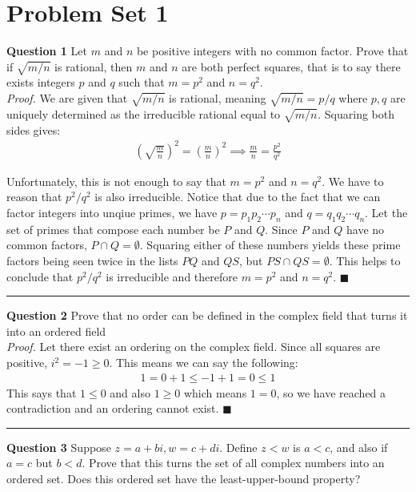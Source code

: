 \documentclass[14pt]{extarticle}
\begin{document}
\section*{Problem Set 1}

\textbf{Question 1} Let $m$ and $n$ be positive integers with no common factor. Prove that if $\sqrt{m/n}$ is rational, then $m$
and $n$ are both perfect squares, that is to say there exists integers $p$ and $q$ such that $m = p^2$ and $n = q^2$.\\

\textit{Proof.} We are given that $\sqrt{m/n}$ is rational, meaning $\sqrt{m/n} = p/q$ where $p, q$ are uniquely determined as the 
irreducible rational equal to $\sqrt{m/n}$. Squaring both sides gives: 
\begin{align*}
    \left(\sqrt{\frac{m}{n}}\right)^2 = \left(\frac{m}{n}\right)^2 \implies \frac{m}{n} = \frac{p^2}{q^2} 
\end{align*}

Unfortunately, this is not enough to say that $m = p^2$ and $n = q^2$. We have to reason that $p^2/q^2$ is also irreducible. Notice
that due to the fact that we can factor integers into unqiue primes, we have $p = p_1p_2\cdots p_n$ and $q = q_1q_2\cdots q_n$. Let the set
of primes that compose each number be $P$ and $Q$. Since $P$ and $Q$ have no common factors, $P \cap Q = \emptyset$. Squaring either of
these numbers yields these prime factors being seen twice in the lists $PQ$ and $QS$, but $PS\cap QS = \emptyset$. This helps
to conclude that $p^2 / q^2$ is irreducible and therefore $m = p^2$ and $n = q^2$.
\hfill
$\blacksquare$

\rule{\textwidth}{0.75pt}
\vspace{2mm}

\textbf{Question 2} Prove that no order can be defined in the complex field that turns it into an ordered field\\

\textit{Proof.} Let there exist an ordering on the complex field. Since all squares are positive, $i^2 = -1 \geq 0$. This means we can 
say the following:
\begin{align*}
    1 = 0 + 1 \leq -1 + 1 = 0 \leq 1
\end{align*}
This says that $1\leq 0$ and also $1 \geq 0$ which means $1 = 0$, so we have reached a contradiction and an ordering cannot exist.
\hfill
$\blacksquare$
\rule{\textwidth}{0.75pt}
\pagebreak


\textbf{Question 3} Suppose $z = a + bi, w = c + di$. Define $z < w$ is $a < c$, and also if $a = c$ but $b < d$. Prove that this
turns the set of all complex numbers into an ordered set. Does this ordered set have the least-upper-bound property?\\
\end{document}

